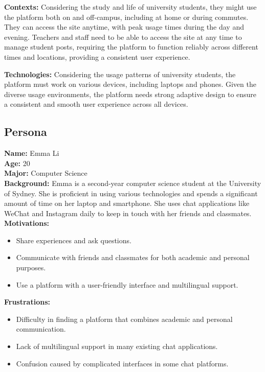 \documentclass[12pt]{article}
\begin{document}
\textbf{Contexts:} Considering the study and life of university students, they might use the platform both on and off-campus, including at home or during commutes. They can access the site anytime, with peak usage times during the day and evening. Teachers and staff need to be able to access the site at any time to manage student posts, requiring the platform to function reliably across different times and locations, providing a consistent user experience.

\textbf{Technologies:} Considering the usage patterns of university students, the platform must work on various devices, including laptops and phones. Given the diverse usage environments, the platform needs strong adaptive design to ensure a consistent and smooth user experience across all devices.

\subsection{Persona}
\textbf{Name:} Emma Li \\
\textbf{Age:} 20 \\
\textbf{Major:} Computer Science \\
\textbf{Background:} Emma is a second-year computer science student at the University of Sydney. She is proficient in using various technologies and spends a significant amount of time on her laptop and smartphone. She uses chat applications like WeChat and Instagram daily to keep in touch with her friends and classmates. \\
\textbf{Motivations:} 
\begin{itemize}
    \item Share experiences and ask questions.
    \item Communicate with friends and classmates for both academic and personal purposes.
    \item Use a platform with a user-friendly interface and multilingual support.
\end{itemize}

\textbf{Frustrations:} 
\begin{itemize}
    \item Difficulty in finding a platform that combines academic and personal communication.
    \item Lack of multilingual support in many existing chat applications.
    \item Confusion caused by complicated interfaces in some chat platforms.
\end{itemize}
\end{document}

